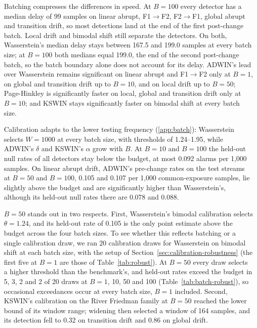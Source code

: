 \documentclass[preprint,12pt]{elsarticle}
\begin{document}
Batching compresses the differences in speed. At $B=100$ every detector has a median delay of 99 samples on linear abrupt, F1$\to$F2, F2$\to$F1, global abrupt and transition drift, so most detections land at the end of the first post-change batch. Local drift and bimodal shift still separate the detectors. On both, Wasserstein's median delay stays between 167.5 and 199.0 samples at every batch size; at $B=100$ both medians equal 199.0, the end of the second post-change batch, so the batch boundary alone does not account for its delay. ADWIN's lead over Wasserstein remains significant on linear abrupt and F1$\to$F2 only at $B=1$, on global and transition drift up to $B=10$, and on local drift up to $B=50$; Page-Hinkley is significantly faster on local, global and transition drift only at $B=10$; and KSWIN stays significantly faster on bimodal shift at every batch size.

Calibration adapts to the lower testing frequency (\ref{app:batch}): Wasserstein selects $W=1000$ at every batch size, with thresholds of 1.24--1.95, while ADWIN's $\delta$ and KSWIN's $\alpha$ grow with $B$. At $B=10$ and $B=100$ the held-out null rates of all detectors stay below the budget, at most 0.092 alarms per 1,000 samples. On linear abrupt drift, ADWIN's pre-change rates on the test streams at $B=50$ and $B=100$, 0.105 and 0.107 per 1,000 common-exposure samples, lie slightly above the budget and are significantly higher than Wasserstein's, although its held-out null rates there are 0.078 and 0.088.

$B=50$ stands out in two respects. First, Wasserstein's bimodal calibration selects $\theta=1.24$, and its held-out rate of 0.105 is the only point estimate above the budget across the four batch sizes. To see whether this reflects batching or a single calibration draw, we ran 20 calibration draws for Wasserstein on bimodal shift at each batch size, with the setup of Section~\ref{sec:calibration-robustness} (the first five at $B=1$ are those of Table~\ref{tab:robust}). At $B=50$ every draw selects a higher threshold than the benchmark's, and held-out rates exceed the budget in 5, 3, 2 and 2 of 20 draws at $B=1$, 10, 50 and 100 (Table~\ref{tab:batch-robust}), so occasional exceedances occur at every batch size, $B=1$ included. Second, KSWIN's calibration on the River Friedman family at $B=50$ reached the lower bound of its window range; widening then selected a window of 164 samples, and its detection fell to 0.32 on transition drift and 0.86 on global drift.
\end{document}
